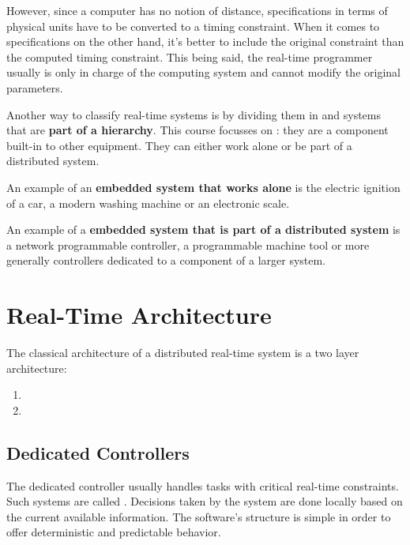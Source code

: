 \documentclass[../main.tex]{subfiles}
\begin{document}
However, since a computer has no notion of distance, specifications in terms of physical units have to be converted to a timing constraint.
When it comes to specifications on the other hand, it's better to include the original constraint than the computed timing constraint.
This being said, the real-time programmer usually is only in charge of the computing system and cannot modify the original parameters.

Another way to classify real-time systems is by dividing them in  and systems that are \textbf{part of a hierarchy}. This course focusses on : they are a component built-in to other equipment. They can either work alone or be part of a distributed system.

\begin{exmp}
An example of an \textbf{embedded system that works alone} is the electric ignition of a car, a modern washing machine or an electronic scale.
\end{exmp} 

\begin{exmp}
An example of a \textbf{embedded system that is part of a distributed system} is a network programmable controller, a programmable machine tool or more generally controllers dedicated to a component of a larger system.
\end{exmp} 


\section{Real-Time Architecture}
The classical architecture of a distributed real-time system is a two layer architecture:
\begin{enumerate}
	\item {} 
	\item {}
\end{enumerate}

\subsection{Dedicated Controllers}
The dedicated controller usually handles tasks with critical real-time constraints. Such systems are called . Decisions taken by the system are done locally based on the current available information. The software's structure is simple in order to offer deterministic and predictable behavior. 
 
\end{document}
